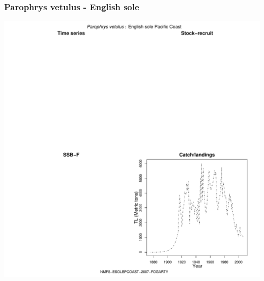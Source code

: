 \subsubsection{Parophrys vetulus - English sole}
\begin{center}
\includegraphics[width=1.2\textwidth]{../R/figures/NMFS-ESOLEPCOAST-2007-FOGARTY.pdf}
\end{center}

